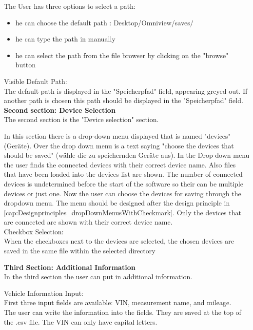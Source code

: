 \documentclass{scrreprt}
\begin{document}
The User has three options to select a path: 
\begin{itemize}
    \item he can choose the default path : Desktop/Omniview/saves/
    \item he can type the path in manually 
    \item he can select the path from the file browser by clicking on the "browse" button
\end{itemize}

Visible Default Path:\\

The default path is displayed in the "Speicherpfad" field, appearing greyed out. If another path is chosen this path should be displayed in the "Speicherpfad" field.\\

\textbf{Second section: Device Selection}\\

The second section is the "Device selection" section. 

In this section there is a drop-down menu displayed that is named "devices" (Geräte). Over the drop down menu is a text saying "choose the devices that should be saved" (wähle die zu speichernden Geräte aus). In the Drop down menu the user finds the connected devices with their correct device name.
Also files that have been loaded into the devices list are shown.
The number of connected devices is undetermined before the start of the software so their can be multiple devices or just one.
Now the user can choose the devices for saving through the dropdown menu. The menu should be designed after the design principle in \ref{cap:Designprinciples_dropDownMenusWithCheckmark}.
Only the devices that are connected are shown with their correct device name.\\

Checkbox Selection:\\

When the checkboxes next to the devices are selected, the chosen devices are saved in the same file within the selected directory

\textbf{Third Section: Additional Information}\\

In the third section the user can put in additional information. 

Vehicle Information Input:\\

First three input fields are available: VIN, measurement name, and mileage.\\
The user can write the information into the fields. They are saved at the top of the .csv file. The VIN can only have capital letters. 
\end{document}
